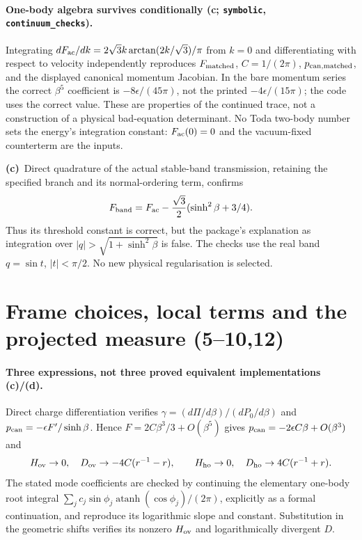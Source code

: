 \documentclass[11pt,a4paper]{article}
\newcommand{\Lc}{\textbf{(c)}\ }
\begin{document}
\paragraph{One-body algebra survives conditionally (c; \texttt{symbolic},
\texttt{continuum\_checks}).}
Integrating $dF_{\rm ac}/dk=2\sqrt3 k\arctan(2k/\sqrt3)/\pi$ from $k=0$
and differentiating with respect to velocity independently reproduces
$F_{\rm matched}$, $C=1/(2\pi)$, $p_{\rm can,matched}$, and the displayed
canonical momentum Jacobian. In the bare momentum series the correct
$\beta^5$ coefficient is $-8\epsilon/(45\pi)$, not the printed
$-4\epsilon/(15\pi)$; the code uses the correct value.
These are properties of the continued trace, not a construction of a physical
bad-equation determinant. No Toda two-body number sets the energy's integration
constant: $F_{\rm ac}(0)=0$ and the vacuum-fixed counterterm are the inputs.

\Lc Direct quadrature of the actual stable-band transmission, retaining the
specified branch and its normal-ordering term, confirms
\[
 F_{\rm band}=F_{\rm ac}-\frac{\sqrt3}{2}(\sinh^2\beta+3/4).
\]
Thus its threshold constant is correct, but the package's explanation as
integration over $|q|>\sqrt{1+\sinh^2\beta}$ is false. The checks use the
real band $q=\sin t$, $|t|<\pi/2$. No new physical regularisation is selected.

\section{Frame choices, local terms and the projected measure (5--10,12)}
\paragraph{Three expressions, not three proved equivalent implementations (c)/(d).}
Direct charge differentiation verifies
$\gamma=(d\Pi/d\beta)/(dP_0/d\beta)$ and $p_{
\rm can}=-\epsilon F'/\sinh\beta$. Hence $F=2C\beta^3/3+O(\beta^5)$ gives
$p_{\rm can}=-2\epsilon C\beta+O(\beta^3)$ and
\[
 H_{\rm ov}\to0,\quad D_{\rm ov}\to-4C(r^{-1}-r),\qquad
 H_{\rm ho}\to0,\quad D_{\rm ho}\to4C(r^{-1}+r).
\]
The stated mode coefficients are checked by continuing the elementary
one-body root integral
$\sum_j c_j\sin\phi_j\operatorname{atanh}(\cos\phi_j)/(2\pi)$,
explicitly as a formal continuation, and reproduce its logarithmic slope and
constant. Substitution in the geometric shifts verifies its nonzero
$H_{\rm ov}$ and logarithmically divergent $D$.
\end{document}
